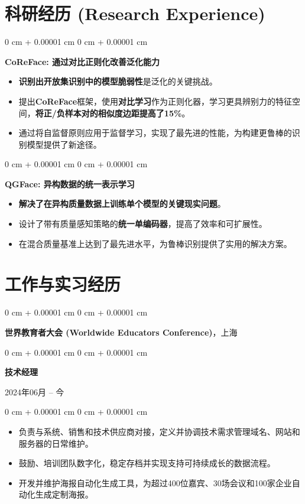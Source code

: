 \documentclass[10pt, letterpaper]{article}
\newenvironment{highlights}{
    \begin{itemize}[
        topsep=0.05 cm,
        parsep=0.05 cm,
        partopsep=0pt,
        itemsep=0pt,
        leftmargin=0.4 cm + 10pt
    ]
}{
    \end{itemize}
} %
\newenvironment{onecolentry}{
    \begin{adjustwidth}{
        0 cm + 0.00001 cm
    }{
        0 cm + 0.00001 cm
    }
}{
    \end{adjustwidth}
} %
\newenvironment{twocolentry}[2][]{
    \onecolentry
    \def\secondColumn{#2}
    \setcolumnwidth{\fill, 4.5 cm}
    \begin{paracol}{2}
}{
    \switchcolumn \raggedleft \secondColumn
    \end{paracol}
    \endonecolentry
} %
\begin{document}
    \section{科研经历 (Research Experience)}
        \begin{onecolentry}
            \textbf{CoReFace: 通过对比正则化改善泛化能力}
            \begin{highlights}
                \item \textbf{识别出开放集识别中的模型脆弱性}是泛化的关键挑战。
                \item 提出\textbf{CoReFace}框架，使用\textbf{对比学习}作为正则化器，学习更具辨别力的特征空间，\textbf{将正/负样本对的相似度边距提高了15\%}。
                \item 通过将自监督原则应用于监督学习，实现了最先进的性能，为构建更鲁棒的识别模型提供了新途径。
            \end{highlights}
        \end{onecolentry}
        \vspace{0.2 cm}
        \begin{onecolentry}
            \textbf{QGFace: 异构数据的统一表示学习}
            \begin{highlights}
                \item \textbf{解决了在异构质量数据上训练单个模型的关键现实问题}。
                \item 设计了带有质量感知策略的\textbf{统一单编码器}，提高了效率和可扩展性。
                \item 在混合质量基准上达到了最先进水平，为鲁棒识别提供了实用的解决方案。
            \end{highlights}
        \end{onecolentry}

\section{工作与实习经历}

    \begin{onecolentry}
        \large\textbf{世界教育者大会 (Worldwide Educators Conference)}，上海
    \end{onecolentry}
    \begin{twocolentry}{
        2024年06月 – 今
    }
        \textbf{技术经理}
    \end{twocolentry}
    \begin{onecolentry}
        \begin{highlights}
            \item 负责与系统、销售和技术供应商对接，定义并协调技术需求管理域名、网站和服务器的日常维护。
            \item 鼓励、培训团队数字化，稳定存档并实现支持可持续成长的数据流程。
            \item 开发并维护海报自动化生成工具，为超过400位嘉宾、30场会议和100家企业自动化生成定制海报。
        \end{highlights}
    \end{onecolentry}
    
\end{document}
